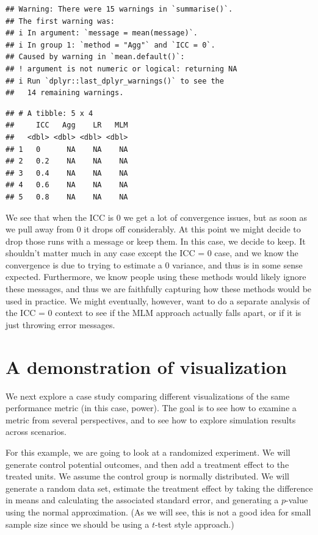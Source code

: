 \documentclass[
]{book}
\begin{document}
\begin{verbatim}
## Warning: There were 15 warnings in `summarise()`.
## The first warning was:
## i In argument: `message = mean(message)`.
## i In group 1: `method = "Agg"` and `ICC = 0`.
## Caused by warning in `mean.default()`:
## ! argument is not numeric or logical: returning NA
## i Run `dplyr::last_dplyr_warnings()` to see the
##   14 remaining warnings.
\end{verbatim}

\begin{verbatim}
## # A tibble: 5 x 4
##     ICC   Agg    LR   MLM
##   <dbl> <dbl> <dbl> <dbl>
## 1   0      NA    NA    NA
## 2   0.2    NA    NA    NA
## 3   0.4    NA    NA    NA
## 4   0.6    NA    NA    NA
## 5   0.8    NA    NA    NA
\end{verbatim}

We see that when the ICC is 0 we get a lot of convergence issues, but as soon as we pull away from 0 it drops off considerably.
At this point we might decide to drop those runs with a message or keep them.
In this case, we decide to keep.
It shouldn't matter much in any case except the ICC = 0 case, and we know the convergence is due to trying to estimate a 0 variance, and thus is in some sense expected.
Furthermore, we know people using these methods would likely ignore these messages, and thus we are faithfully capturing how these methods would be used in practice.
We might eventually, however, want to do a separate analysis of the ICC = 0 context to see if the MLM approach actually falls apart, or if it is just throwing error messages.

\section{A demonstration of visualization}\label{a-demonstration-of-visualization}

We next explore a case study comparing different visualizations of the same performance metric (in this case, power).
The goal is to see how to examine a metric from several perspectives, and to see how to explore simulation results across scenarios.

For this example, we are going to look at a randomized experiment.
We will generate control potential outcomes, and then add a treatment effect to the treated units.
We assume the control group is normally distributed.
We will generate a random data set, estimate the
treatment effect by taking the difference in means and calculating the
associated standard error, and generating a \(p\)-value using the normal
approximation. (As we will see, this is not a good idea for small sample
size since we should be using a \(t\)-test style approach.)
\end{document}
